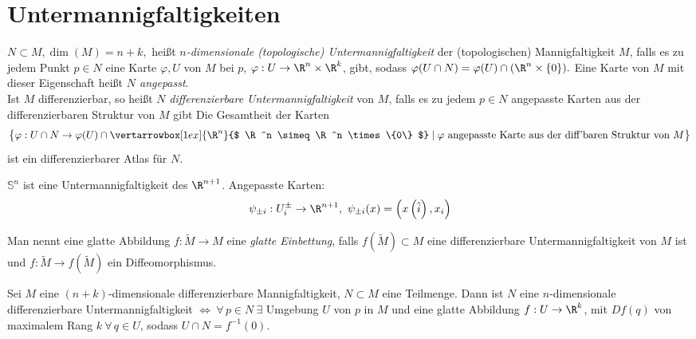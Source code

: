 \section{Untermannigfaltigkeiten}

\begin{defn}
	$ N \subset M, \dim(M) = n+k, $ heißt \emph{$n$-dimensionale (topologische) Untermannigfaltigkeit} der (topologischen) Mannigfaltigkeit $M$, falls es zu jedem Punkt $p \in N$ eine Karte $ \varphi,U$ von $M$ bei $p$, $ \varphi: U \to \R^n \times \R^k $, gibt, sodass $ \varphi(U \cap N) = \varphi(U) \cap (\R^n \times \{0\}). $ Eine Karte von $M$ mit dieser Eigenschaft heißt \emph{$N$ angepasst}.\\
	Ist $M$ differenzierbar, so heißt $N$ \emph{differenzierbare Untermannigfaltigkeit} von $M$, falls es zu jedem $p \in N$ angepasste Karten aus der differenzierbaren Struktur von $M$ gibt Die Gesamtheit der Karten 
	$$ \big\{ \varphi: U \cap N \to \varphi(U) \cap \vertarrowbox[1ex]{\R^n}{$ \R^n \simeq \R^n \times \{0\} $} \mid \varphi\ \text{angepasste Karte aus der diff'baren Struktur von } M \big\} $$
	ist ein differenzierbarer Atlas für $N$.
	\begin{exmp*}
		$ \mathbb{S}^n $ ist eine Untermannigfaltigkeit des $\R^{n+1}$. Angepasste Karten:
		\[ \psi_{\pm i}: U_i^\pm \to \R^{n+1},\ \psi_{\pm i}(x) = \left( x \left( \hat{i} \right),x_i \right) \]
	\end{exmp*}
	Man nennt eine glatte Abbildung $ f: \tilde{M} \to M $ eine \emph{glatte Einbettung}, falls $ f\left( \tilde{M} \right) \subset M $ eine differenzierbare Untermannigfaltigkeit von $M$ ist und $ f: \tilde{M} \to f\left( \tilde{M} \right) $ ein Diffeomorphismus.
\end{defn}

\begin{thm}
	Sei $M$ eine $(n+k)$-dimensionale differenzierbare Mannigfaltigkeit, $ N \subset M$ eine Teilmenge. Dann ist $N$ eine $n$-dimensionale differenzierbare Untermannigfaltigkeit $ \iff \ \forall\, p \in N \ \exists $ Umgebung $U$ von $p$ in $M$ und eine glatte Abbildung $ f: U \to \R^k$, mit $ Df(q) $ von maximalem Rang $k\ \forall\, q \in U$, sodass $ U \cap N = f^{-1}(0). $
\end{thm}

\addtocounter{lecture}{1}

